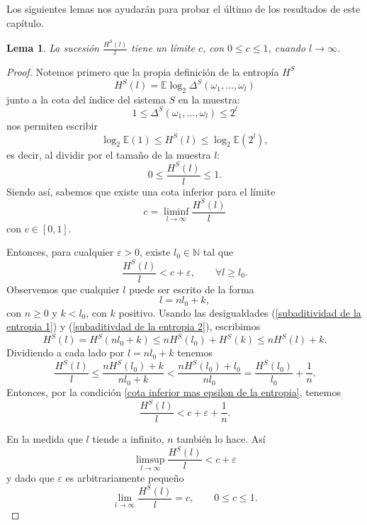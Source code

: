 \documentclass{report}
\newtheorem{lem}{Lema}[section]
\begin{document}
Los siguientes lemas nos ayudarán para probar el último de los resultados de este capítulo.

\begin{lem}\label{lema 3}
    La sucesión \( \frac{H^{\mathcal{S}}(l)}{l} \) tiene un límite \( c \), con \( 0 \leq c \leq 1 \), cuando \( l \to \infty \).
\end{lem}

\begin{proof}
    Notemos primero que la propia definición de la entropía $H^S$
    \[
    H^S(l) = \mathbb{E}\log_2 \Delta^S(\omega_1,\ldots,\omega_l)
    \]
    junto a la cota del índice del sistema $S$ en la muestra:
    \[
    1 \leq \Delta^S(\omega_1,\ldots,\omega_l) \leq 2^l
    \]
    nos permiten escribir
    \[
    \log_2 \mathbb{E} (1) \leq H^S(l) \leq \log_2 \mathbb{E} \left(2^l\right),
    \]
    es decir, al dividir por el tamaño de la muestra $l$:
    \begin{equation} \label{cota de la entropia}
        0 \leq \frac{H^S(l)}{l} \leq 1.
    \end{equation}
    Siendo así, sabemos que existe una cota inferior para el límite
    \[
    c = \liminf_{l\to\infty} \frac{H^S(l)}{l}
    \]
    con $c\in [0,1]$.

    Entonces, para cualquier $\varepsilon>0$, existe $l_0\in\mathbb{N}$ tal que
    \begin{equation}\label{cota inferior mas epsilon de la entropia}
        \frac{H^S(l)}{l} < c + \varepsilon, \qquad \forall l \geq l_0.
    \end{equation}
    Observemos que cualquier $l$ puede ser escrito de la forma
    \[
        l = n l_0 + k,
    \]
    con $n\geq 0$ y $k<l_0$, con $k$ positivo. Usando las desigualdades (\ref{subaditividad de la entropia 1})
    y (\ref{subaditivdad de la entropia 2}), escribimos
    \begin{equation*}
        H^S(l) = H^S(nl_0+k) \leq nH^S(l_0) + H^S(k) \leq nH^S(l) + k.
    \end{equation*}
    Dividiendo a cada lado por $l=nl_0+k$ tenemos
    \[
        \frac{H^S(l)}{l} \leq \frac{nH^S(l_0) + k}{nl_0+k} < \frac{nH^S(l_0) + l_0}{nl_0} = \frac{H^S(l_0)}{l_0} + \frac{1}{n}.
    \]
    Entonces, por la condición \ref{cota inferior mas epsilon de la entropia}, tenemos
    \[
    \frac{H^S(l)}{l} < c + \varepsilon + \frac{1}{n}.
    \]

    En la medida que $l$ tiende a infinito, $n$ también lo hace. Así
    \[
        \limsup_{l\to\infty} \frac{H^S(l)}{l} < c + \varepsilon
    \]
y dado que $\varepsilon$ es arbitrariamente pequeño
    \[
        \lim_{l\to\infty} \frac{H^S(l)}{l} = c, \qquad 0\leq c\leq 1.
    \]
\end{proof}
\end{document}
